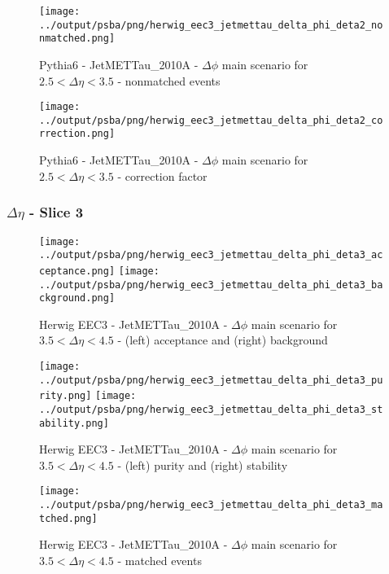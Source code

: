 \documentclass[11pt]{book}
\begin{document}
\begin{figure}[ht]
\centering
\texttt{[image: ../output/psba/png/herwig\_eec3\_jetmettau\_delta\_phi\_deta2\_nonmatched.png]}
\caption{Pythia6 - JetMETTau\_2010A - $\Delta\phi$ main scenario for $2.5 < \Delta\eta < 3.5$ - nonmatched events}
\label{fig:p6_jetmettau_delta_phi_deta2_nonmatched}
\end{figure}

\begin{figure}[ht]
\centering
\texttt{[image: ../output/psba/png/herwig\_eec3\_jetmettau\_delta\_phi\_deta2\_correction.png]}
\caption{Pythia6 - JetMETTau\_2010A - $\Delta\phi$ main scenario for $2.5 < \Delta\eta < 3.5$ - correction factor}
\label{fig:p6_jetmettau_delta_phi_deta2_correction}
\end{figure}

\clearpage
\subsubsection{$\Delta\eta$ - Slice 3}

\begin{figure}[ht]
\centering
\texttt{[image: ../output/psba/png/herwig\_eec3\_jetmettau\_delta\_phi\_deta3\_acceptance.png]}
\texttt{[image: ../output/psba/png/herwig\_eec3\_jetmettau\_delta\_phi\_deta3\_background.png]}
\caption{Herwig EEC3 - JetMETTau\_2010A - $\Delta\phi$ main scenario for $3.5 < \Delta\eta < 4.5$ - (left) acceptance and (right) background}
\label{fig:hw_eec3_jetmettau_delta_phi_deta3_ab}
\end{figure}

\begin{figure}[ht]
\centering
\texttt{[image: ../output/psba/png/herwig\_eec3\_jetmettau\_delta\_phi\_deta3\_purity.png]}
\texttt{[image: ../output/psba/png/herwig\_eec3\_jetmettau\_delta\_phi\_deta3\_stability.png]}
\caption{Herwig EEC3 - JetMETTau\_2010A - $\Delta\phi$ main scenario for $3.5 < \Delta\eta < 4.5$ - (left) purity and (right) stability}
\label{fig:hw_eec3_jetmettau_delta_phi_deta3_ps}
\end{figure}

\begin{figure}[ht]
\centering
\texttt{[image: ../output/psba/png/herwig\_eec3\_jetmettau\_delta\_phi\_deta3\_matched.png]}
\caption{Herwig EEC3 - JetMETTau\_2010A - $\Delta\phi$ main scenario for $3.5 < \Delta\eta < 4.5$ - matched events}
\label{fig:hw_eec3_jetmettau_delta_phi_deta3_matched}
\end{figure}
\end{document}
